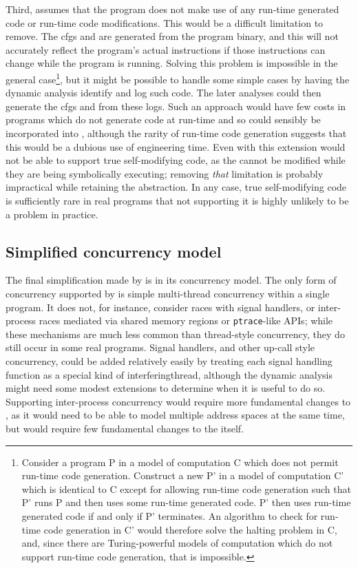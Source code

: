 Third, {\implementation} assumes that the program does not make use of
any run-time generated code or run-time code modifications.  This
would be a difficult limitation to remove.  The \glspl{cfg} and
{\StateMachines} are generated from the program binary, and this will
not accurately reflect the program's actual instructions if those
instructions can change while the program is running.  Solving this
problem is impossible in the general case\footnote{Consider a program
  P in a model of computation C which does not permit run-time code
  generation.  Construct a new P' in a model of computation C' which
  is identical to C except for allowing run-time code generation such
  that P' runs P and then uses some run-time generated code.  P' then
  uses run-time generated code if and only if P' terminates.  An
  algorithm to check for run-time code generation in C' would
  therefore solve the halting problem in C, and, since there are
  Turing-powerful models of computation which do not support run-time
  code generation, that is impossible.}, but it might be possible to
handle some simple cases by having the dynamic analysis identify and
log such code.  The later analyses could then generate the \glspl{cfg}
and {\StateMachines} from these logs.  Such an approach would have few
costs in programs which do not generate code at run-time and so could
sensibly be incorporated into {\implementation}, although the rarity
of run-time code generation suggests that this would be a dubious use
of engineering time.  Even with this extension {\implementation} would
not be able to support true self-modifying code, as the
{\StateMachines} cannot be modified while they are being symbolically
executing; removing \emph{that} limitation is probably impractical
while retaining the {\StateMachine} abstraction.  In any case, true
self-modifying code is sufficiently rare in real programs that not
supporting it is highly unlikely to be a problem in practice.

\subsection{Simplified concurrency model}
The final simplification made by {\implementation} is in its
concurrency model.  The only form of concurrency supported by
{\implementation} is simple multi-thread concurrency within a single
program.  It does not, for instance, consider races with signal
handlers, or inter-process races mediated via shared memory regions or
\texttt{ptrace}-like APIs; while these mechanisms are much less common
than thread-style concurrency, they do still occur in some real
programs.  Signal handlers, and other up-call style concurrency, could
be added relatively easily by treating each signal handling function
as a special kind of \gls{interferingthread}, although the dynamic
analysis might need some modest extensions to determine when it is
useful to do so.  Supporting inter-process concurrency would require
more fundamental changes to {\implementation}, as it would need to be
able to model multiple address spaces at the same time, but would
require few fundamental changes to the {\technique} itself.

